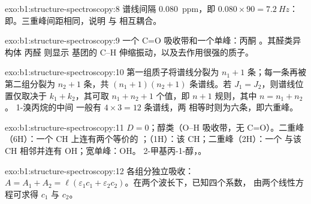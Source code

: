 \begin{solution}{exo:b1:structure-spectroscopy:8}
谱线间隔 \qty{0.080}{ppm}，即 $0.080 \times 90 = \qty{7.2}{Hz}$：
即。三重峰间距相同，说明  与
 相互耦合。
\end{solution}

\begin{solution}{exo:b1:structure-spectroscopy:9}
一个 C=O 吸收带和一个单峰：丙酮 。其醛类异构体
丙醛  则显示
 基团的 C--H 伸缩振动，以及去作用很强的质子。
\end{solution}

\begin{solution}{exo:b1:structure-spectroscopy:10}
第一组质子将谱线分裂为 $n_1 + 1$ 条；每一条再被第二组分裂为
$n_2 + 1$ 条，共 $(n_1 + 1)(n_2 + 1)$ 条谱线。若 $J_1 =
J_2$，则谱线位置仅取决于 $k_1 + k_2$，其可取 $n_1 + n_2 +
1$ 个值，即 $n + 1$ 规则，其中 $n = n_1 + n_2$。
1-溴丙烷的中间  一般有 $4 \times 3 = 12$ 条谱线，两
相等时则为六条，即六重峰。
\end{solution}

\begin{solution}{exo:b1:structure-spectroscopy:11}
$D = 0$；醇类（O--H 吸收带，无 C=O）。二重峰（6H）：一个 CH 上连有两个等价的
；（1H）：该 CH；二重峰（2H）：一个 
与该 CH 相邻并连有 OH；宽单峰：OH。
2-甲基丙-1-醇，。
\end{solution}

\begin{solution}{exo:b1:structure-spectroscopy:12}
各组分独立吸收：$A = A_1 + A_2 = \ell(\varepsilon_1c_1
+ \varepsilon_2c_2)$。在两个波长下，已知四个系数，
由两个线性方程可求得 $c_1$ 与 $c_2$。
\end{solution}

